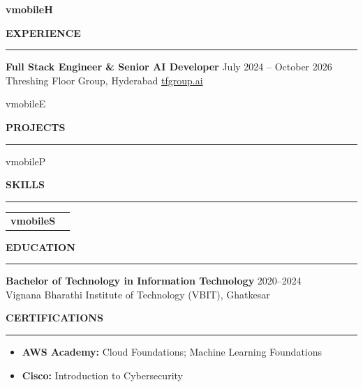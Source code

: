 \documentclass{resume}
\renewenvironment{rSection}[1]{
    \vspace{8pt}
    \noindent
    {\bfseries\MakeUppercase{#1}}
    \par
    \vspace{-3.5pt}
    \noindent\rule{\textwidth}{0.4pt}
    \par
    \vspace{4pt}
}{
    \vspace{3pt}
}
\def\Variant{mobile}
\newcommand{\Headline}{\csname v\Variant H\endcsname}
\newcommand{\ExpList}{\csname v\Variant E\endcsname}
\newcommand{\ProjList}{\csname v\Variant P\endcsname}
\newcommand{\SkillOrder}{\csname v\Variant S\endcsname}
\begin{document}
\sloppy

\begin{center}\large\textbf{\Headline}\end{center}

\begin{rSection}{Experience}
\textbf{Full Stack Engineer \& Senior AI Developer} \hfill July 2024 -- October 2026 \\
Threshing Floor Group, Hyderabad \hfill \href{https://tfgroup.ai/en}{tfgroup.ai}
\begin{itemize}
\ExpList
\end{itemize}
\end{rSection}

\begin{rSection}{Projects}
\begin{itemize}
\ProjList
\end{itemize}
\end{rSection}

\begin{rSection}{Skills}
\begin{tabularx}{\textwidth}{@{}>{\bfseries}p{1.6in}X@{}}
\SkillOrder
\end{tabularx}
\end{rSection}

\begin{rSection}{Education}
\textbf{Bachelor of Technology in Information Technology} \hfill 2020--2024 \\
Vignana Bharathi Institute of Technology (VBIT), Ghatkesar
\end{rSection}

\begin{rSection}{Certifications}
\begin{itemize}
\item \textbf{AWS Academy:} Cloud Foundations; Machine Learning Foundations
\item \textbf{Cisco:} Introduction to Cybersecurity
\end{itemize}
\end{rSection}
\end{document}
